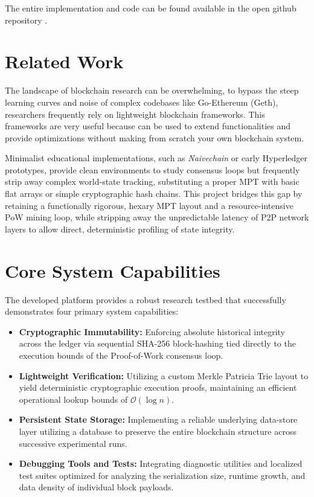 \documentclass[10pt, conference]{IEEEtran}
\begin{document}
	The entire implementation and code can be found available in the open github repository \cite{jowy-ti_dsproject}.
	
	\section{Related Work}
	
	The landscape of blockchain research can be overwhelming, to bypass the steep learning curves and noise of complex codebases like Go-Ethereum (Geth), researchers frequently rely on lightweight blockchain frameworks. This frameworks are very useful because can be used to extend functionalities and provide optimizations without making from scratch your own blockchain system.
	
	Minimalist educational implementations, such as \textit{Naivechain}\cite{hartikka} or early Hyperledger prototypes, provide clean environments to study consensus loops but frequently strip away complex world-state tracking, substituting a proper MPT with basic flat arrays or simple cryptographic hash chains.  This project bridges this gap by retaining a functionally rigorous, hexary MPT layout and a resource-intensive PoW mining loop, while stripping away the unpredictable latency of P2P network layers to allow direct, deterministic profiling of state integrity.
	
	\section{Core System Capabilities}
	The developed platform provides a robust research testbed that successfully demonstrates four primary system capabilities:
	\begin{itemize}
		\item \textbf{Cryptographic Immutability:} Enforcing absolute historical integrity across the ledger via sequential SHA-256 block-hashing tied directly to the execution bounds of the Proof-of-Work consensus loop.
		\item \textbf{Lightweight Verification:} Utilizing a custom Merkle Patricia Trie layout to yield deterministic cryptographic execution proofs, maintaining an efficient operational lookup bounds of $\mathcal{O}(\log n)$.
		\textmu \item \textbf{Persistent State Storage:} Implementing a reliable underlying data-store layer utilizing a database to preserve the entire blockchain structure across successive experimental runs.
		\item \textbf{Debugging Tools and Tests:} Integrating diagnostic utilities and localized test suites optimized for analyzing the serialization size, runtime growth, and data density of individual block payloads.
	\end{itemize}
	
\end{document}
